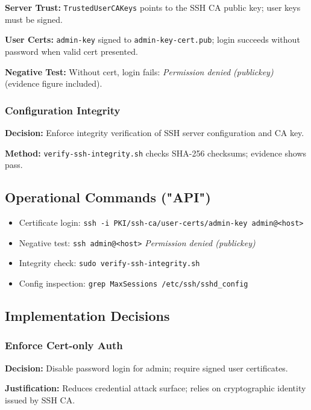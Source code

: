 \textbf{Server Trust:} \texttt{TrustedUserCAKeys} points to the SSH CA public key; user keys must be signed.

\textbf{User Certs:} \texttt{admin-key} signed to \texttt{admin-key-cert.pub}; login succeeds without password when valid cert presented.

\textbf{Negative Test:} Without cert, login fails: \emph{Permission denied (publickey)} (evidence figure included).

\subsubsection{Configuration Integrity}

\textbf{Decision:} Enforce integrity verification of SSH server configuration and CA key.

\textbf{Method:} \texttt{verify-ssh-integrity.sh} checks SHA-256 checksums; evidence shows pass.

\subsection{Operational Commands ("API")}

\begin{itemize}
    \item Certificate login: \texttt{ssh -i PKI/ssh-ca/user-certs/admin-key admin@<host>}
    \item Negative test: \texttt{ssh admin@<host>} \Rightarrow \emph{Permission denied (publickey)}
    \item Integrity check: \texttt{sudo verify-ssh-integrity.sh}
    \item Config inspection: \texttt{grep MaxSessions /etc/ssh/sshd\_config}
\end{itemize}

\subsection{Implementation Decisions}

\subsubsection{Enforce Cert-only Auth}

\textbf{Decision:} Disable password login for admin; require signed user certificates.

\textbf{Justification:} Reduces credential attack surface; relies on cryptographic identity issued by SSH CA.

